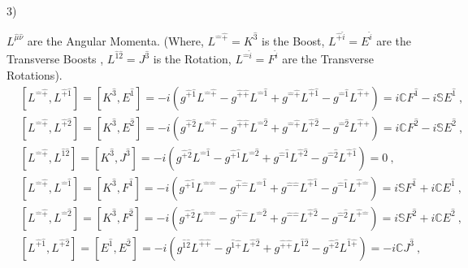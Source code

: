 \documentclass[12pt,a4paper]{report}
\begin{document}
3)

$L^{\hat{\mu}\hat{\nu}}$ are the Angular Momenta. (Where, $L^{\hat{-}\hat{+}}=K^\hat{3}$ is  the Boost, $L^{\hat{+}\hat{i}}=E^\hat{i}$ are the  Transverse Boosts , $L^{\hat{1}\hat{2}}=J^\hat{3}$ is the Rotation, $L^{\hat{-}\hat{i}}=F^\hat{i}$ are the  Transverse Rotations). 
\begin{align*}
    &\left[L^{\hat{-}\hat{+}},L^{\hat{+}\hat{1}}\right]=\left[K^{\hat{3}},E^\hat{1}\right]=-i\left(g^{\hat{+}\hat{1}}L^{\hat{-}\hat{+}}-g^{\hat{+}\hat{+}}L^{\hat{-}\hat{1}}+g^{\hat{-}\hat{+}}L^{\hat{+}\hat{1}}-g^{\hat{-}\hat{1}}L^{\hat{+}\hat{+}}\right)=i\mathbb{C}F^{\hat{1}}-i\mathbb{S}E^{\hat{1}}~,\\
    &\left[L^{\hat{-}\hat{+}},L^{\hat{+}\hat{2}}\right]=\left[K^{\hat{3}},E^\hat{2}\right]=-i\left(g^{\hat{+}\hat{2}}L^{\hat{-}\hat{+}}-g^{\hat{+}\hat{+}}L^{\hat{-}\hat{2}}+g^{\hat{-}\hat{+}}L^{\hat{+}\hat{2}}-g^{\hat{-}\hat{2}}L^{\hat{+}\hat{+}}\right)=i\mathbb{C}F^{\hat{2}}-i\mathbb{S}E^{\hat{2}}~,\\
    &\left[L^{\hat{-}\hat{+}},L^{\hat{1}\hat{2}}\right]=\left[K^{\hat{3}},J^{\hat{3}}\right]=-i\left(g^{\hat{+}\hat{2}}L^{\hat{-}\hat{1}}-g^{\hat{+}\hat{1}}L^{\hat{-}\hat{2}}+g^{\hat{-}\hat{1}}L^{\hat{+}\hat{2}}-g^{\hat{-}\hat{2}}L^{\hat{+}\hat{1}}\right)=0~,\\
    &\left[L^{\hat{-}\hat{+}},L^{\hat{-}\hat{1}}\right]=\left[K^{\hat{3}},F^{\hat{1}}\right]=-i\left(g^{\hat{+}\hat{1}}L^{\hat{-}\hat{-}}-g^{\hat{+}\hat{-}}L^{\hat{-}\hat{1}}+g^{\hat{-}\hat{-}}L^{\hat{+}\hat{1}}-g^{\hat{-}\hat{1}}L^{\hat{+}\hat{-}}\right)=i\mathbb{S}F^{\hat{1}}+i\mathbb{C}E^{\hat{1}}~,\\
    &\left[L^{\hat{-}\hat{+}},L^{\hat{-}\hat{2}}\right]=\left[K^{\hat{3}},F^{\hat{2}}\right]=-i\left(g^{\hat{+}\hat{2}}L^{\hat{-}\hat{-}}-g^{\hat{+}\hat{-}}L^{\hat{-}\hat{2}}+g^{\hat{-}\hat{-}}L^{\hat{+}\hat{2}}-g^{\hat{-}\hat{2}}L^{\hat{+}\hat{-}}\right)=i\mathbb{S}F^{\hat{2}}+i\mathbb{C}E^{\hat{2}}~,\\
    &\left[L^{\hat{+}\hat{1}},L^{\hat{+}\hat{2}}\right]=\left[E^{\hat{1}},E^{\hat{2}}\right]=-i\left(g^{\hat{1}\hat{2}}L^{\hat{+}\hat{+}}-g^{\hat{1}\hat{+}}L^{\hat{+}\hat{2}}+g^{\hat{+}\hat{+}}L^{\hat{1}\hat{2}}-g^{\hat{+}\hat{2}}L^{\hat{1}\hat{+}}\right)=-i\mathbb{C}J^{\hat{3}}~,\\

\end{align*}
\end{document}
